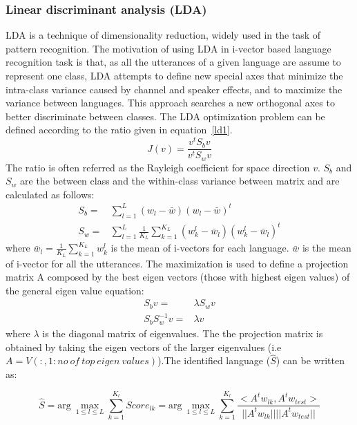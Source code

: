 \begin{spacing}{1.5}
 \subsubsection{Linear discriminant analysis (LDA)}
 LDA is a technique of dimensionality reduction, widely used in the task of pattern recognition. The motivation of using LDA in i-vector based language recognition task is that, as all the utterances of a given language are assume to represent one class, LDA attempts to define new special axes that minimize the intra-class variance caused by channel and speaker effects, and to maximize the variance between languages. This approach searches a new orthogonal axes to better discriminate between classes. The LDA optimization problem can be defined according to the ratio given in equation~\ref{ld1}. 
 \begin{equation}
     \label{ld1}
     J(v)=\frac{v^{t}S_{b}v}{v^{t}S_{w}v}
 \end{equation}
 The ratio is often referred as the Rayleigh coefficient for space direction $v$. $S_{b}$ and $S_{w}$ are the between class and the within-class variance between matrix and are calculated as follows:
 \begin{equation}
 \begin{aligned}
   S_{b}=&\sum_{l=1}^{L}(w_{l}-\bar{w})(w_{l}-\bar{w})^{t}\\
   S_{w}=&\sum_{l=1}^{L}\frac{1}{K_{L}}\sum_{k=1}^{K_{L}}(w_{k}^{l}-\bar{w}_{l})(w_{k}^{l}-\bar{w}_{l})^{t}
 \end{aligned}
 \end{equation}
 where $\bar{w}_{l}=\frac{1}{K_{L}}\sum_{k=1}^{K_{L}}w_{k}^{l}$ is the mean of i-vectors for each language. $\bar{w}$ is the mean of i-vector for all the utterances. The maximization is used to define a projection matrix A composed by the best eigen vectors (those with highest eigen values) of the general eigen value equation:
 \begin{equation}
     \begin{aligned}
      S_{b}v=&\lambda S_{w}v\\
      S_{b}S_{w}^{-1}v=&\lambda v
     \end{aligned}
 \end{equation}
 where $\lambda$ is the diagonal matrix of eigenvalues. The the projection matrix is obtained by taking the eigen vectors of the larger eigenvalues (i.e $A=V(:,1:no~of~top~eigen~values)$).The identified language ($\hat{S}$) can be written as:
 
 \begin{equation}
     \hat{S}=\mbox{arg}~\max_{1 \leq l \leq L} \sum_{k=1}^{K_{l}} Score_{lk}=\mbox{arg}~\max_{1 \leq l \leq L} \sum_{k=1}^{K_{l}} \frac{<A^{t}w_{lk},A^{t}w_{test}>}{||A^{t}w_{lk}||||A^{t}w_{test}||}
 \end{equation}
  

\end{spacing}
